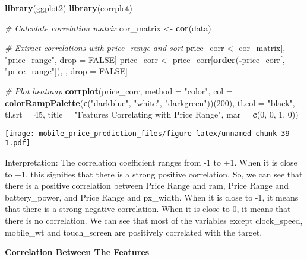 \documentclass[
]{article}
\newenvironment{Shaded}{\begin{snugshade}}{\end{snugshade}}
\newcommand{\AttributeTok}[1]{\textcolor[rgb]{0.13,0.29,0.53}{#1}}
\newcommand{\CommentTok}[1]{\textcolor[rgb]{0.56,0.35,0.01}{\textit{#1}}}
\newcommand{\ConstantTok}[1]{\textcolor[rgb]{0.56,0.35,0.01}{#1}}
\newcommand{\DecValTok}[1]{\textcolor[rgb]{0.00,0.00,0.81}{#1}}
\newcommand{\FunctionTok}[1]{\textcolor[rgb]{0.13,0.29,0.53}{\textbf{#1}}}
\newcommand{\NormalTok}[1]{#1}
\newcommand{\OtherTok}[1]{\textcolor[rgb]{0.56,0.35,0.01}{#1}}
\newcommand{\SpecialCharTok}[1]{\textcolor[rgb]{0.81,0.36,0.00}{\textbf{#1}}}
\newcommand{\StringTok}[1]{\textcolor[rgb]{0.31,0.60,0.02}{#1}}
\begin{document}
\begin{Shaded}
\begin{Highlighting}[]
\FunctionTok{library}\NormalTok{(ggplot2)}
\FunctionTok{library}\NormalTok{(corrplot)}

\CommentTok{\# Calculate correlation matrix}
\NormalTok{cor\_matrix }\OtherTok{\textless{}{-}} \FunctionTok{cor}\NormalTok{(data)}

\CommentTok{\# Extract correlations with price\_range and sort}
\NormalTok{price\_corr }\OtherTok{\textless{}{-}}\NormalTok{ cor\_matrix[, }\StringTok{"price\_range"}\NormalTok{, drop }\OtherTok{=} \ConstantTok{FALSE}\NormalTok{]}
\NormalTok{price\_corr }\OtherTok{\textless{}{-}}\NormalTok{ price\_corr[}\FunctionTok{order}\NormalTok{(}\SpecialCharTok{{-}}\NormalTok{price\_corr[, }\StringTok{"price\_range"}\NormalTok{]), , drop }\OtherTok{=} \ConstantTok{FALSE}\NormalTok{]}

\CommentTok{\# Plot heatmap}
\FunctionTok{corrplot}\NormalTok{(price\_corr, }\AttributeTok{method =} \StringTok{"color"}\NormalTok{, }
         \AttributeTok{col =} \FunctionTok{colorRampPalette}\NormalTok{(}\FunctionTok{c}\NormalTok{(}\StringTok{"darkblue"}\NormalTok{, }\StringTok{"white"}\NormalTok{, }\StringTok{"darkgreen"}\NormalTok{))(}\DecValTok{200}\NormalTok{),}
         \AttributeTok{tl.col =} \StringTok{"black"}\NormalTok{, }\AttributeTok{tl.srt =} \DecValTok{45}\NormalTok{, }
         \AttributeTok{title =} \StringTok{"Features Correlating with Price Range"}\NormalTok{,}
         \AttributeTok{mar =} \FunctionTok{c}\NormalTok{(}\DecValTok{0}\NormalTok{, }\DecValTok{0}\NormalTok{, }\DecValTok{1}\NormalTok{, }\DecValTok{0}\NormalTok{))}
\end{Highlighting}
\end{Shaded}

\texttt{[image: mobile\_price\_prediction\_files/figure-latex/unnamed-chunk-39-1.pdf]}

Interpretation: The correlation coefficient ranges from -1 to +1. When
it is close to +1, this signifies that there is a strong positive
correlation. So, we can see that there is a positive correlation between
Price Range and ram, Price Range and battery\_power, and Price Range and
px\_width. When it is close to -1, it means that there is a strong
negative correlation. When it is close to 0, it means that there is no
correlation. We can see that most of the variables except clock\_speed,
mobile\_wt and touch\_screen are positively correlated with the target.

\textbf{Correlation Between The Features}
\end{document}

